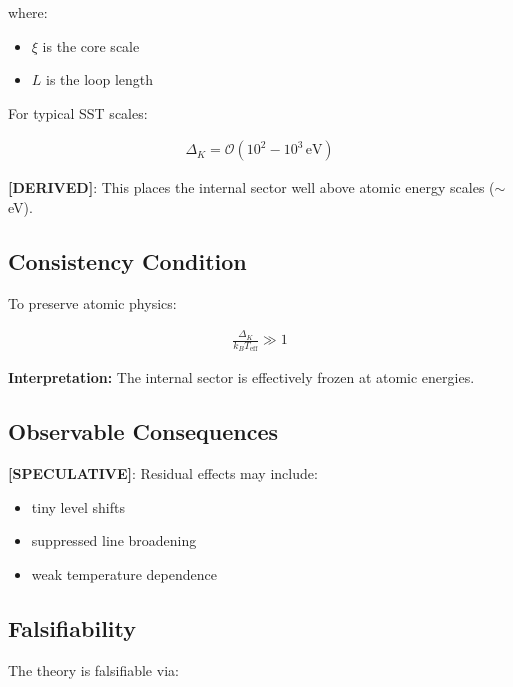 \documentclass[11pt]{article}
\theoremstyle{definition}
\theoremstyle{plain}
\theoremstyle{remark}
\begin{document}
        where:
        \begin{itemize}
            \item $\xi$ is the core scale
            \item $L$ is the loop length
        \end{itemize}
        
        For typical SST scales:
        
        \begin{align}
            \Delta_K = \mathcal{O}(10^2 - 10^3 \, \text{eV})
        \end{align}
        
        \textbf{[DERIVED]}:
        This places the internal sector well above atomic energy scales ($\sim$ eV).
    
    \subsection{Consistency Condition}
        
        To preserve atomic physics:
        
        \begin{align}
            \frac{\Delta_K}{k_B T_{\text{eff}}} \gg 1
        \end{align}
        
        \textbf{Interpretation:}
        The internal sector is effectively frozen at atomic energies.
    
    \subsection{Observable Consequences}
        
        \textbf{[SPECULATIVE]}:
        Residual effects may include:
        
        \begin{itemize}
            \item tiny level shifts
            \item suppressed line broadening
            \item weak temperature dependence
        \end{itemize}
    
    \subsection{Falsifiability}
        
        The theory is falsifiable via:
        
\end{document}
